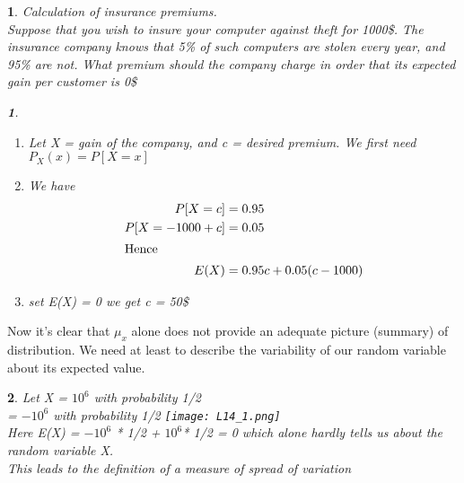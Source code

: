 \documentclass[11pt]{article}
\newtheorem*{solution}{\framebox{Sol}}
\newtheorem{example}{\framebox{Ex}}[section]
\newcommand\tab[1][1cm]{\hspace*{#1}}
\begin{document}
            \begin{example}
                Calculation of insurance premiums. \\
                Suppose that you wish to insure your computer against theft for 1000\$. The insurance company knows that 5\% of such computers are stolen every year,
                and 95\% are not. What premium should the company charge in order that its expected gain per customer is 0\$
                \begin{solution} \tab
                    \begin{enumerate}
                        \item Let X = gain of the company, and c = desired premium. We first need $P_X(x) = P[X = x]$
                        \item We have 
                            \begin{align*}
                                P[X = c]    &= 0.95 \\
                                P[X = -1000+c]  &= 0.05 \\
                                \intertext{Hence}
                                E(X)    &= 0.95c + 0.05(c-1000) 
                            \end{align*}
                        \item set E(X) = 0 we get c = 50\$
                    \end{enumerate}
                \end{solution}
            \end{example}
            Now it's clear that $\mu_x$ alone does not provide an adequate picture (summary) of distribution. 
            We need at least to describe the variability of our random variable about its expected value. 
            \begin{example}
                Let X = $10^6$ with probability 1/2\\
                    \tab \tab \tab = $-10^{6}$ with probability 1/2
                    \texttt{[image: L14\_1.png]}\\
                    Here E(X) = $-10^6$ * 1/2 + $10^6$* 1/2 = 0 which alone hardly tells us about the random variable X.\\
                    This leads to the definition of a measure of spread of variation
            \end{example}
\end{document}
